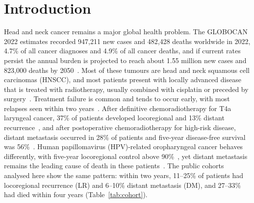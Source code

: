 \documentclass[pdflatex,iicol,sn-nature]{sn-jnl}
\begin{document}
\maketitle

\section{Introduction}\label{sec:intro}

Head and neck cancer remains a major global health problem. The GLOBOCAN 2022 estimates recorded 947,211 new cases and 482,428 deaths worldwide in 2022, 4.7\% of all cancer diagnoses and 4.9\% of all cancer deaths, and if current rates persist the annual burden is projected to reach about 1.55 million new cases and 823,000 deaths by 2050~\cite{bray2024globocan,sun2025hnburden}. Most of these tumours are head and neck squamous cell carcinomas (HNSCC), and most patients present with locally advanced disease that is treated with radiotherapy, usually combined with cisplatin or preceded by surgery~\cite{johnson2020hnscc}. Treatment failure is common and tends to occur early, with most relapses seen within two years~\cite{diezfraile2022relapse}. After definitive chemoradiotherapy for T4a laryngeal cancer, 37\% of patients developed locoregional and 13\% distant recurrence~\cite{voora2022t4a}, and after postoperative chemoradiotherapy for high-risk disease, distant metastasis occurred in 28\% of patients and five-year disease-free survival was 56\%~\cite{aihara2026postop}. Human papillomavirus (HPV)-related oropharyngeal cancer behaves differently, with five-year locoregional control above 90\%~\cite{contrera2020hpv}, yet distant metastasis remains the leading cause of death in these patients~\cite{sadeghi2025nectors}. The public cohorts analysed here show the same pattern: within two years, 11--25\% of patients had locoregional recurrence (LR) and 6--10\% distant metastasis (DM), and 27--33\% had died within four years (Table~\ref{tab:cohort}).
\end{document}
